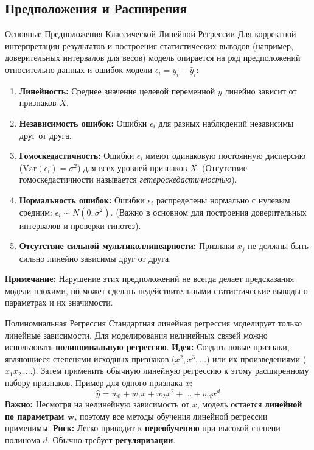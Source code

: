 \subsection{Предположения и Расширения}

\begin{alerttextbox}{Основные Предположения Классической Линейной Регрессии}
    Для корректной интерпретации результатов и построения статистических выводов (например, доверительных интервалов для весов) модель опирается на ряд предположений относительно данных и ошибок модели $\epsilon_i = y_i - \hat{y}_i$:
    \begin{enumerate}[nosep, leftmargin=*]
        \item \textbf{Линейность:} Среднее значение целевой переменной $y$ линейно зависит от признаков $X$.
        \item \textbf{Независимость ошибок:} Ошибки $\epsilon_i$ для разных наблюдений независимы друг от друга.
        \item \textbf{Гомоскедастичность:} Ошибки $\epsilon_i$ имеют одинаковую постоянную дисперсию ($\text{Var}(\epsilon_i) = \sigma^2$) для всех уровней признаков $X$. (Отсутствие гомоскедастичности называется \textit{гетероскедастичностью}).
        \item \textbf{Нормальность ошибок:} Ошибки $\epsilon_i$ распределены нормально с нулевым средним: $\epsilon_i \sim N(0, \sigma^2)$. (Важно в основном для построения доверительных интервалов и проверки гипотез).
        \item \textbf{Отсутствие сильной мультиколлинеарности:} Признаки $x_j$ не должны быть сильно линейно зависимы друг от друга.
    \end{enumerate}
    \textbf{Примечание:} Нарушение этих предположений не всегда делает предсказания модели плохими, но может сделать недействительными статистические выводы о параметрах и их значимости.
\end{alerttextbox}

\begin{myblock}{Полиномиальная Регрессия}
    Стандартная линейная регрессия моделирует только линейные зависимости. Для моделирования нелинейных связей можно использовать \textbf{полиномиальную регрессию}.
    \textbf{Идея:} Создать новые признаки, являющиеся степенями исходных признаков ($x^2, x^3, \dots$) или их произведениями ($x_1 x_2, \dots$). Затем применить обычную линейную регрессию к этому расширенному набору признаков.
    Пример для одного признака $x$:
    \[ \hat{y} = w_0 + w_1 x + w_2 x^2 + \dots + w_d x^d \]
    \textbf{Важно:} Несмотря на нелинейную зависимость от $x$, модель остается \textbf{линейной по параметрам $\mathbf{w}$}, поэтому все методы обучения линейной регрессии применимы.
    \textbf{Риск:} Легко приводит к \textbf{переобучению} при высокой степени полинома $d$. Обычно требует \textbf{регуляризации}.
\end{myblock}


